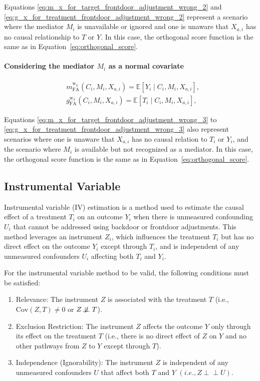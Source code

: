 \documentclass{article}
\numberwithin{equation}{section}
\begin{document}
Equations \eqref{eq:m_x_for_target_frontdoor_adjustment_wrong_2} and \eqref{eq:g_x_for_treatment_frontdoor_adjustment_wrong_2} represent a scenario where the mediator $M_i$ is unavailable or ignored and one is unaware that $X_{a, i}$ has no causal relationship to $T$ or $Y$. In this case, the orthogonal score function is the same as in Equation~\eqref{eq:orthogonal_score}.

\paragraph{Considering the mediator $M_i$ as a normal covariate}

\begin{align}
    & m_{\text{FA}}^{\text{w}_3}(C_i, M_i, X_{a, i}) = \mathbb{E}[Y_i \mid C_i, M_i, X_{a, i}],
    \label{eq:m_x_for_target_frontdoor_adjustment_wrong_3} \\
    & g_{\text{FA}}^{\text{w}_3}(C_i, M_i, X_{a, i}) = \mathbb{E}[T_i \mid C_i, M_i, X_{a, i}],
    \label{eq:g_x_for_treatment_frontdoor_adjustment_wrong_3}
\end{align}

Equations \eqref{eq:m_x_for_target_frontdoor_adjustment_wrong_3} to \eqref{eq:g_x_for_treatment_frontdoor_adjustment_wrong_3} also represent scenarios where one is unaware that $X_{a, i}$ has no causal relation to $T_i$ or $Y_i$, and the scenario where $M_i$ is available but not recognized as a mediator. In this case, the orthogonal score function is the same as in Equation~\eqref{eq:orthogonal_score}.

\subsection{Instrumental Variable}

Instrumental variable (IV) estimation is a method used to estimate the causal effect of a treatment $T_i$ on an outcome $Y_i$ when there is unmeasured confounding $U_i$ that cannot be addressed using backdoor or frontdoor adjustments. This method leverages an instrument $Z_i$, which influences the treatment $T_i$ but has no direct effect on the outcome $Y_i$ except through $T_i$, and is independent of any unmeasured confounders $U_i$ affecting both $T_i$ and $Y_i$.

For the instrumental variable method to be valid, the following conditions must be satisfied:

\begin{enumerate}
\item Relevance: The instrument $Z$ is associated with the treatment  $T$  (i.e.,  $\text{Cov}(Z, T) \neq 0$  or \( Z \not\!\perp\!\!\!\perp T \)).
\item Exclusion Restriction: The instrument $Z$ affects the outcome $Y$ only through its effect on the treatment $T$ (i.e., there is no direct effect of $Z$ on $Y$ and no other pathways from $Z$ to $Y$ except through  $T$).
\item Independence (Ignorability): The instrument $Z$ is independent of any unmeasured confounders $U$ that affect both $T$ and $Y$ $(i.e.,  Z \perp\!\!\!\perp U )$.
\end{enumerate}
\end{document}
